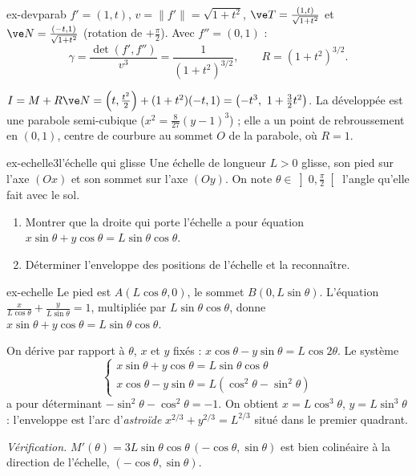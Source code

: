 \begin{corrige}{ex-devparab}
 $f'=(1,t)$, $v=\|f'\|=\sqrt{1+t^2}$, $\ve T=\frac{(1,t)}{\sqrt{1+t^2}}$ et $\ve N=\frac{(-t,1)}{\sqrt{1+t^2}}$ (rotation de $+\frac\pi2$). Avec $f''=(0,1)$ :
\[\gamma=\frac{\det(f',f'')}{v^3}=\frac1{(1+t^2)^{3/2}},\qquad R=(1+t^2)^{3/2}.\]

 $I=M+R\ve N=\left(t,\frac{t^2}2\right)+(1+t^2)(-t,1)=\left(-t^3,\ 1+\frac32t^2\right)$. La développée est une parabole semi-cubique ($x^2=\frac8{27}(y-1)^3$) ; elle a un point de rebroussement en $(0,1)$, centre de courbure au sommet $O$ de la parabole, où $R=1$.
\end{corrige}

\begin{exo}{ex-echelle}{3}{l'échelle qui glisse}
Une échelle de longueur $L>0$ glisse, son pied sur l'axe $(Ox)$ et son sommet sur l'axe $(Oy)$. On note $\theta\in\left]0,\frac\pi2\right[$ l'angle qu'elle fait avec le sol.
\begin{enumerate}
\item Montrer que la droite qui porte l'échelle a pour équation $x\sin\theta+y\cos\theta=L\sin\theta\cos\theta$.
\item Déterminer l'enveloppe des positions de l'échelle et la reconnaître.
\end{enumerate}
\end{exo}

\begin{corrige}{ex-echelle}
 Le pied est $A(L\cos\theta,0)$, le sommet $B(0,L\sin\theta)$. L'équation $\frac x{L\cos\theta}+\frac y{L\sin\theta}=1$, multipliée par $L\sin\theta\cos\theta$, donne $x\sin\theta+y\cos\theta=L\sin\theta\cos\theta$.

 On dérive par rapport à $\theta$, $x$ et $y$ fixés : $x\cos\theta-y\sin\theta=L\cos2\theta$. Le système
\[\begin{cases}x\sin\theta+y\cos\theta=L\sin\theta\cos\theta\\ x\cos\theta-y\sin\theta=L(\cos^2\theta-\sin^2\theta)\end{cases}\]
a pour déterminant $-\sin^2\theta-\cos^2\theta=-1$. On obtient $x=L\cos^3\theta$, $y=L\sin^3\theta$ : l'enveloppe est l'arc d'\emph{astroïde} $x^{2/3}+y^{2/3}=L^{2/3}$ situé dans le premier quadrant.

\emph{Vérification.} $M'(\theta)=3L\sin\theta\cos\theta\,(-\cos\theta,\sin\theta)$ est bien colinéaire à la direction de l'échelle, $(-\cos\theta,\sin\theta)$.
\end{corrige}

